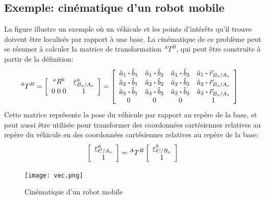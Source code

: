 \newpage
\subsection{Exemple: cinématique d'un robot mobile}

La figure illustre un exemple où un véhicule et les points d’intérêts qu'il trouve doivent être localisés par rapport à une base. La cinématique de ce problème peut se résumer à calculer la matrice de transformation $^AT^B$, qui peut être construite à partir de la définition:
\begin{align}
{}^AT^B &= 
\left[ \begin{array}{c c } 
^aR^b & \underline{r}_{B_o/A_o}^a \\ 0 \; 0 \; 0 & 1
\end{array} \right] 
=
\left[ \begin{array}{c c c c} 
\hat{a}_1 \boldsymbol{\cdot} \hat{b}_1  &  \hat{a}_1 \boldsymbol{\cdot} \hat{b}_2  &  \hat{a}_1 \boldsymbol{\cdot} \hat{b}_3 & \hat{a}_1 \boldsymbol{\cdot} \vec{r}_{B_o/A_o} \\
\hat{a}_2 \boldsymbol{\cdot} \hat{b}_1  &  \hat{a}_2 \boldsymbol{\cdot} \hat{b}_2  &  \hat{a}_2 \boldsymbol{\cdot} \hat{b}_3 & \hat{a}_2 \boldsymbol{\cdot} \vec{r}_{B_o/A_o}\\
\hat{a}_3 \boldsymbol{\cdot} \hat{b}_1  &  \hat{a}_3 \boldsymbol{\cdot} \hat{b}_2  &  \hat{a}_3 \boldsymbol{\cdot} \hat{b}_3 & \hat{a}_3 \boldsymbol{\cdot} \vec{r}_{B_o/A_o} \\
0 & 0 & 0 & 1
\end{array} \right] 
\label{eq:transformationdef_app}
\end{align} 
Cette matrice représente la pose du véhicule par rapport au repère de la base, et peut aussi être utilisée pour transformer des coordonnées cartésiennes relatives au repère du véhicule en des coordonnées cartésiennes relatives au repère de la base:
\begin{align}
\left[ \begin{array}{c} 
\underline{r}_{C/A_o}^a \\ 1
\end{array} \right] 
= 
{}^AT^B
\left[ \begin{array}{c} 
\underline{r}_{C/B_o}^b \\ 1
\end{array} \right] 
\label{eq:homo1_app}
\end{align} 

\begin{figure}[H]
	\centering
		\texttt{[image: vec.png]}
	\caption{Cinématique d'un robot mobile}
	\label{fig:vec}
\end{figure}



